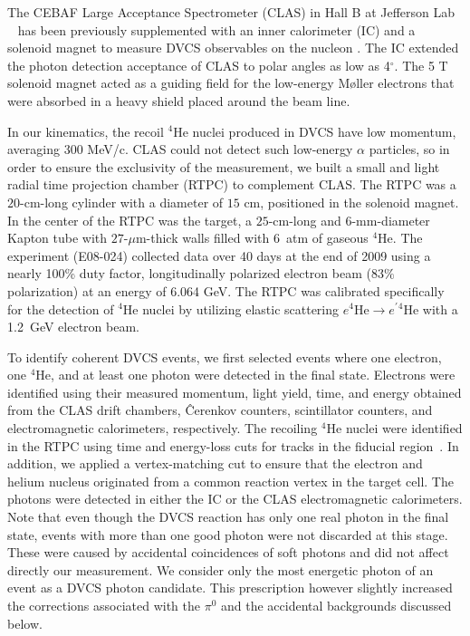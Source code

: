\documentclass[twocolumn,nofootinbib,showpacs,prl,superscriptaddress,secnumarabic,amssymb,nobibnotes,aps,floatfix]{revtex4}
\begin{document}
The CEBAF Large Acceptance Spectrometer (CLAS) in Hall B at Jefferson Lab ~\cite{Mecking:2003zu} has been
previously supplemented with an inner calorimeter (IC) and a solenoid magnet to
measure DVCS observables on the nucleon
\cite{Girod:2007aa,Gavalian:2009,Seder:2015,Pisano:2015,Jo:2015ema}. The IC 
extended the photon detection acceptance of CLAS to polar angles as low as 
4$^{\circ}$. The 5 T solenoid magnet acted as a guiding field for the 
low-energy M\o{}ller electrons that were absorbed in a  
heavy shield placed around the beam line. 

In our kinematics, the recoil $^4$He nuclei produced in DVCS have low momentum,
averaging 300 MeV/c. CLAS could not detect such low-energy $\alpha$ 
particles, so in order to ensure the exclusivity of the measurement, we built a 
small and light radial time projection chamber (RTPC) to complement CLAS. The 
RTPC was a $20$-cm-long cylinder with a diameter of $15$ cm, positioned in the 
solenoid magnet. In the center of the RTPC was the target, a $25$-cm-long 
and $6$-mm-diameter Kapton tube with $27$-$\mu$m-thick walls filled with 
6~atm of gaseous $^4$He. The experiment (E08-024) collected
data over 40 days at the end of 2009 using a 
nearly 100\% duty factor, longitudinally polarized electron beam (83$\%$ 
polarization) at an energy of 6.064 GeV. The RTPC was calibrated specifically 
for the detection of $^4$He nuclei by utilizing elastic scattering 
$e^4$He$\to e^\prime$$^4$He with a 1.2~GeV electron beam.

To identify coherent DVCS events, we first selected events where one electron, 
one $^4$He, and at least one photon were detected in the final state. Electrons 
were identified using their measured momentum, light yield, time, and energy obtained from 
the CLAS drift chambers, \^{C}erenkov counters, scintillator counters, 
and electromagnetic calorimeters, respectively. The recoiling $^4$He nuclei 
were identified in the RTPC using time and energy-loss cuts for tracks in the 
fiducial region~\cite{Hattawy:thesis}. In addition, we applied a vertex-matching 
cut to ensure that the 
electron and helium nucleus originated from a common reaction vertex in the 
target cell. The photons were 
detected in either the IC or the CLAS electromagnetic calorimeters. Note that 
even though the DVCS reaction has only one real photon in the final state, 
events with more than one good photon were not discarded at this stage. These
were caused by accidental coincidences of soft photons and did not affect 
directly our measurement. We consider only the most energetic photon of an 
event as a DVCS photon candidate.
This prescription however slightly increased the corrections associated with
the $\pi^0$ and the accidental backgrounds discussed below. 
\end{document}
